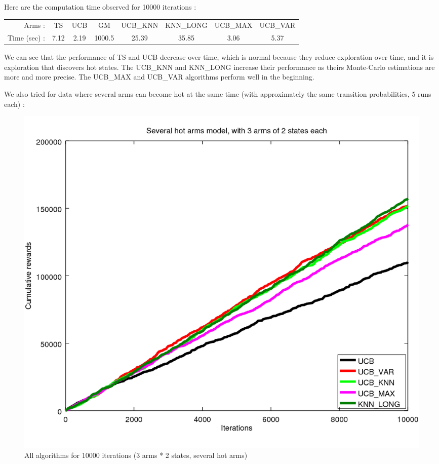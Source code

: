 \documentclass{article} %
\begin{document}
Here are the computation time observed for 10000 iterations :
\begin{center}
	\begin{tabular}{rccccccc}
		Arms : & TS & UCB & GM & UCB\_KNN & KNN\_LONG & UCB\_MAX & UCB\_VAR \\
		Time (sec) : & 7.12 & 2.19 & 1000.5 & 25.39 & 35.85 & 3.06 & 5.37
	\end{tabular}
\end{center}

We can see that the performance of TS and UCB decrease over time, which is normal because they reduce exploration over time, and it is exploration that discovers hot states. The UCB\_KNN and KNN\_LONG increase their performance as theirs Monte-Carlo estimations are more and more precise. The UCB\_MAX and UCB\_VAR algorithms perform well in the beginning.

\clearpage
We also tried for data where several arms can become hot at the same time (with approximately the same transition probabilities, 5 runs each) :

\begin{figure}[h]
	\begin{center}
		\includegraphics[width=1.0\textwidth]{all_m_10000it.png}
	\end{center}
	\caption{All algorithms for 10000 iterations (3 arms * 2 states, several hot arms)}
\end{figure}
\end{document}
